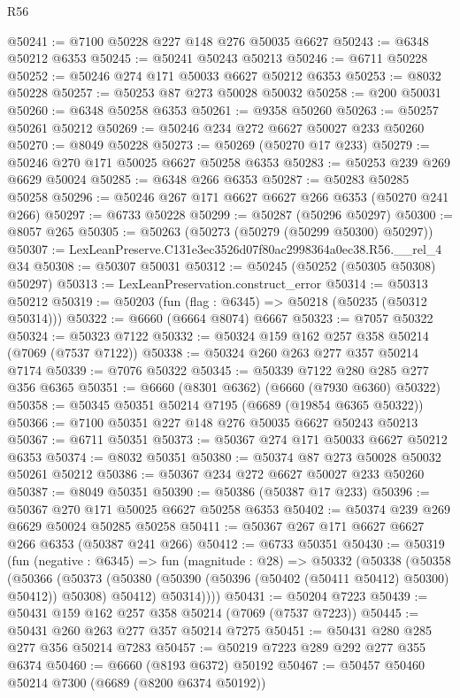 \begin{lexlean}{R56}
\begin{coremodule}
@50241 := @7100 @50228 @227 @148 @276 @50035 @6627
@50243 := @6348 @50212 @6353
@50245 := @50241 @50243 @50213
@50246 := @6711 @50228
@50252 := @50246 @274 @171 @50033 @6627 @50212 @6353
@50253 := @8032 @50228
@50257 := @50253 @87 @273 @50028 @50032
@50258 := @200 @50031
@50260 := @6348 @50258 @6353
@50261 := @9358 @50260
@50263 := @50257 @50261 @50212
@50269 := @50246 @234 @272 @6627 @50027 @233 @50260
@50270 := @8049 @50228
@50273 := @50269 (@50270 @17 @233)
@50279 := @50246 @270 @171 @50025 @6627 @50258 @6353
@50283 := @50253 @239 @269 @6629 @50024
@50285 := @6348 @266 @6353
@50287 := @50283 @50285 @50258
@50296 := @50246 @267 @171 @6627 @6627 @266 @6353 (@50270 @241 @266)
@50297 := @6733 @50228
@50299 := @50287 (@50296 @50297)
@50300 := @8057 @265
@50305 := @50263 (@50273 (@50279 (@50299 @50300) @50297))
@50307 := LexLeanPreserve.C131e3ec3526d07f80ac2998364a0ec38.R56.__rel_4 @34
@50308 := @50307 @50031
@50312 := @50245 (@50252 (@50305 @50308) @50297)
@50313 := LexLeanPreservation.construct_error
@50314 := @50313 @50212
@50319 := @50203 (fun (flag : @6345) => @50218 (@50235 (@50312 @50314)))
@50322 := @6660 (@6664 @8074) @6667
@50323 := @7057 @50322
@50324 := @50323 @7122
@50332 := @50324 @159 @162 @257 @358 @50214 (@7069 (@7537 @7122))
@50338 := @50324 @260 @263 @277 @357 @50214 @7174
@50339 := @7076 @50322
@50345 := @50339 @7122 @280 @285 @277 @356 @6365
@50351 := @6660 (@8301 @6362) (@6660 (@7930 @6360) @50322)
@50358 := @50345 @50351 @50214 @7195 (@6689 (@19854 @6365 @50322))
@50366 := @7100 @50351 @227 @148 @276 @50035 @6627 @50243 @50213
@50367 := @6711 @50351
@50373 := @50367 @274 @171 @50033 @6627 @50212 @6353
@50374 := @8032 @50351
@50380 := @50374 @87 @273 @50028 @50032 @50261 @50212
@50386 := @50367 @234 @272 @6627 @50027 @233 @50260
@50387 := @8049 @50351
@50390 := @50386 (@50387 @17 @233)
@50396 := @50367 @270 @171 @50025 @6627 @50258 @6353
@50402 := @50374 @239 @269 @6629 @50024 @50285 @50258
@50411 := @50367 @267 @171 @6627 @6627 @266 @6353 (@50387 @241 @266)
@50412 := @6733 @50351
@50430 := @50319
    (fun (negative : @6345) =>
    fun (magnitude : @28) =>
    @50332
      (@50338
        (@50358
          (@50366
            (@50373 (@50380 (@50390 (@50396 (@50402 (@50411 @50412) @50300) @50412)) @50308) @50412)
            @50314))))
@50431 := @50204 @7223
@50439 := @50431 @159 @162 @257 @358 @50214 (@7069 (@7537 @7223))
@50445 := @50431 @260 @263 @277 @357 @50214 @7275
@50451 := @50431 @280 @285 @277 @356 @50214 @7283
@50457 := @50219 @7223 @289 @292 @277 @355 @6374
@50460 := @6660 (@8193 @6372) @50192
@50467 := @50457 @50460 @50214 @7300 (@6689 (@8200 @6374 @50192))

\end{coremodule}
\end{lexlean}

